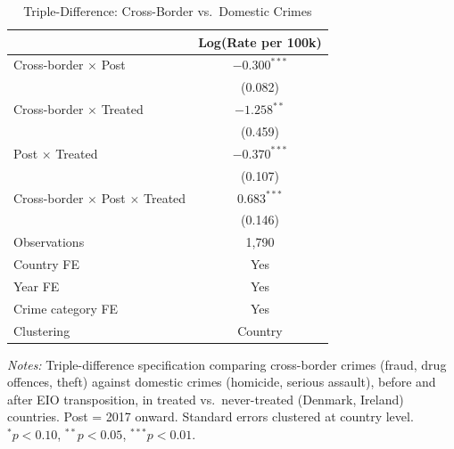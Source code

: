 \begin{table}[t]
\centering
\caption{Triple-Difference: Cross-Border vs.~Domestic Crimes}
\label{tab:ddd}
\begin{tabular}{lc}
\hline\hline
 & Log(Rate per 100k) \\
\hline
Cross-border $\times$ Post & $-0.300^{***}$ \\
 & (0.082) \\[0.3ex]
Cross-border $\times$ Treated & $-1.258^{**}$ \\
 & (0.459) \\[0.3ex]
Post $\times$ Treated & $-0.370^{***}$ \\
 & (0.107) \\[0.3ex]
Cross-border $\times$ Post $\times$ Treated & $0.683^{***}$ \\
 & (0.146) \\[0.3ex]
\hline
Observations & 1,790 \\
Country FE & Yes \\
Year FE & Yes \\
Crime category FE & Yes \\
Clustering & Country \\
\hline\hline
\end{tabular}
\begin{tablenotes}
\item \textit{Notes:} Triple-difference specification comparing cross-border crimes (fraud, drug offences, theft) against domestic crimes (homicide, serious assault), before and after EIO transposition, in treated vs.~never-treated (Denmark, Ireland) countries. Post = 2017 onward. Standard errors clustered at country level. $^{*}p<0.10$, $^{**}p<0.05$, $^{***}p<0.01$.
\end{tablenotes}
\end{table}
